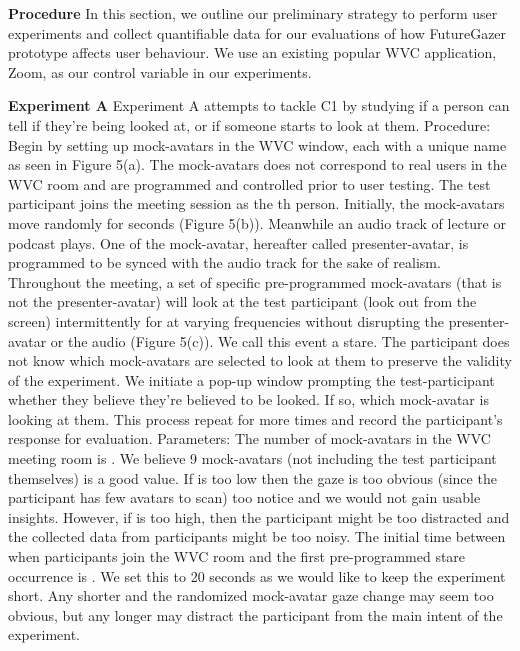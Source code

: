 \documentclass[sigconf,authordraft]{acmart}
\begin{document}
\newline
\textbf{Procedure}
\newline
In this section, we outline our preliminary strategy to perform user experiments and collect quantifiable data for our evaluations of how FutureGazer prototype affects user behaviour. We use an existing popular WVC application, Zoom, as our control variable in our experiments. 

\textbf{Experiment A}
\newline
Experiment A attempts to tackle C1 by studying if a person can tell if they’re being looked at, or if someone starts to look at them. 
Procedure: Begin by setting up  mock-avatars in the WVC window, each with a unique name as seen in Figure 5(a). The mock-avatars does not correspond to real users in the WVC room and are programmed and controlled prior to user testing.
The test participant joins the meeting session as the th person. Initially, the mock-avatars move randomly for  seconds (Figure 5(b)). Meanwhile an audio track of lecture or podcast plays. One of the mock-avatar, hereafter called presenter-avatar, is programmed to be synced with the audio track for the sake of realism. 
Throughout the meeting, a set of specific pre-programmed mock-avatars (that is not the presenter-avatar) will look at the test participant (look out from the screen) intermittently for  at varying frequencies without disrupting the presenter-avatar or the audio (Figure 5(c)). We call this event a stare. The participant does not know which mock-avatars are selected to look at them to preserve the validity of the experiment. We initiate a pop-up window prompting the test-participant whether they believe they’re believed to be looked. If so, which mock-avatar is looking at them. This process repeat for  more times and record the participant’s response for evaluation. 
Parameters: The number of mock-avatars in the WVC meeting room is . We believe 9 mock-avatars (not including the test participant themselves) is a good value. If  is too low then the gaze is too obvious (since the participant has few avatars to scan) too notice and we would not gain usable insights. However, if  is too high, then the participant might be too distracted and the collected data from participants might be too noisy.
The initial time between when participants join the WVC room and the first pre-programmed stare occurrence is . We set this to 20 seconds as we would like to keep the experiment short. Any shorter and the randomized mock-avatar gaze change may seem too obvious, but any longer may distract the participant from the main intent of the experiment. 
\end{document}
